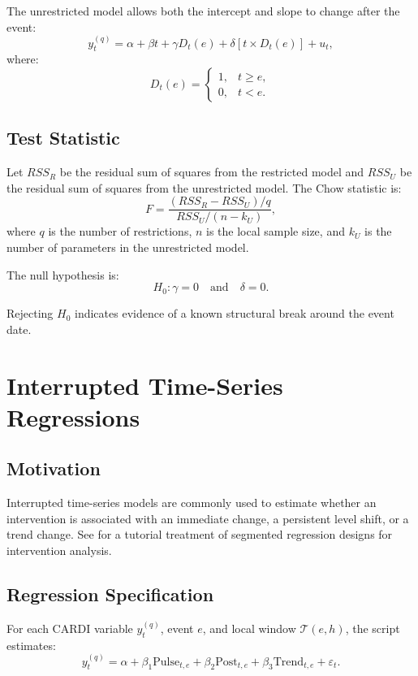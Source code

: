 \documentclass[11pt]{article}
\begin{document}
The unrestricted model allows both the intercept and slope to change after the
event:
\begin{equation}
y_t^{(q)}
= \alpha + \beta t
+ \gamma D_t(e)
+ \delta \left[t \times D_t(e)\right]
+ u_t,
\end{equation}
where:
\[
D_t(e) =
\begin{cases}
1, & t \geq e,\\
0, & t < e.
\end{cases}
\]

\subsection{Test Statistic}

Let \(RSS_R\) be the residual sum of squares from the restricted model and
\(RSS_U\) be the residual sum of squares from the unrestricted model. The Chow
statistic is:
\begin{equation}
F
=
\frac{(RSS_R - RSS_U)/q}{RSS_U/(n-k_U)},
\end{equation}
where \(q\) is the number of restrictions, \(n\) is the local sample size, and
\(k_U\) is the number of parameters in the unrestricted model.

The null hypothesis is:
\[
H_0: \gamma = 0 \quad \text{and} \quad \delta = 0.
\]

Rejecting \(H_0\) indicates evidence of a known structural break around the
event date.

\section{Interrupted Time-Series Regressions}

\subsection{Motivation}

Interrupted time-series models are commonly used to estimate whether an
intervention is associated with an immediate change, a persistent level shift,
or a trend change. See \citet{bernal2017} for a tutorial treatment of segmented
regression designs for intervention analysis.

\subsection{Regression Specification}

For each CARDI variable \(y_t^{(q)}\), event \(e\), and local window
\(\mathcal{T}(e,h)\), the script estimates:
\begin{equation}
y_t^{(q)}
= \alpha
+ \beta_1 \text{Pulse}_{t,e}
+ \beta_2 \text{Post}_{t,e}
+ \beta_3 \text{Trend}_{t,e}
+ \varepsilon_t.
\end{equation}
\end{document}
